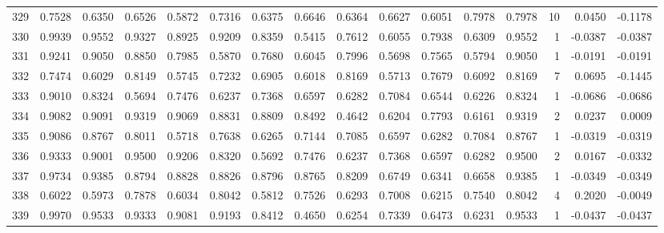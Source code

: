 \begin{tabular}{lrrrrrrrrrrrrrrr}
329 &      0.7528 &  0.6350 &  0.6526 &  0.5872 &  0.7316 &  0.6375 &  0.6646 &  0.6364 &  0.6627 &  0.6051 &   0.7978 &     0.7978 &     10 &                    0.0450 &                    -0.1178 \\
330 &      0.9939 &  0.9552 &  0.9327 &  0.8925 &  0.9209 &  0.8359 &  0.5415 &  0.7612 &  0.6055 &  0.7938 &   0.6309 &     0.9552 &      1 &                   -0.0387 &                    -0.0387 \\
331 &      0.9241 &  0.9050 &  0.8850 &  0.7985 &  0.5870 &  0.7680 &  0.6045 &  0.7996 &  0.5698 &  0.7565 &   0.5794 &     0.9050 &      1 &                   -0.0191 &                    -0.0191 \\
332 &      0.7474 &  0.6029 &  0.8149 &  0.5745 &  0.7232 &  0.6905 &  0.6018 &  0.8169 &  0.5713 &  0.7679 &   0.6092 &     0.8169 &      7 &                    0.0695 &                    -0.1445 \\
333 &      0.9010 &  0.8324 &  0.5694 &  0.7476 &  0.6237 &  0.7368 &  0.6597 &  0.6282 &  0.7084 &  0.6544 &   0.6226 &     0.8324 &      1 &                   -0.0686 &                    -0.0686 \\
334 &      0.9082 &  0.9091 &  0.9319 &  0.9069 &  0.8831 &  0.8809 &  0.8492 &  0.4642 &  0.6204 &  0.7793 &   0.6161 &     0.9319 &      2 &                    0.0237 &                     0.0009 \\
335 &      0.9086 &  0.8767 &  0.8011 &  0.5718 &  0.7638 &  0.6265 &  0.7144 &  0.7085 &  0.6597 &  0.6282 &   0.7084 &     0.8767 &      1 &                   -0.0319 &                    -0.0319 \\
336 &      0.9333 &  0.9001 &  0.9500 &  0.9206 &  0.8320 &  0.5692 &  0.7476 &  0.6237 &  0.7368 &  0.6597 &   0.6282 &     0.9500 &      2 &                    0.0167 &                    -0.0332 \\
337 &      0.9734 &  0.9385 &  0.8794 &  0.8828 &  0.8826 &  0.8796 &  0.8765 &  0.8209 &  0.6749 &  0.6341 &   0.6658 &     0.9385 &      1 &                   -0.0349 &                    -0.0349 \\
338 &      0.6022 &  0.5973 &  0.7878 &  0.6034 &  0.8042 &  0.5812 &  0.7526 &  0.6293 &  0.7008 &  0.6215 &   0.7540 &     0.8042 &      4 &                    0.2020 &                    -0.0049 \\
339 &      0.9970 &  0.9533 &  0.9333 &  0.9081 &  0.9193 &  0.8412 &  0.4650 &  0.6254 &  0.7339 &  0.6473 &   0.6231 &     0.9533 &      1 &                   -0.0437 &                    -0.0437 \\

\end{tabular}
